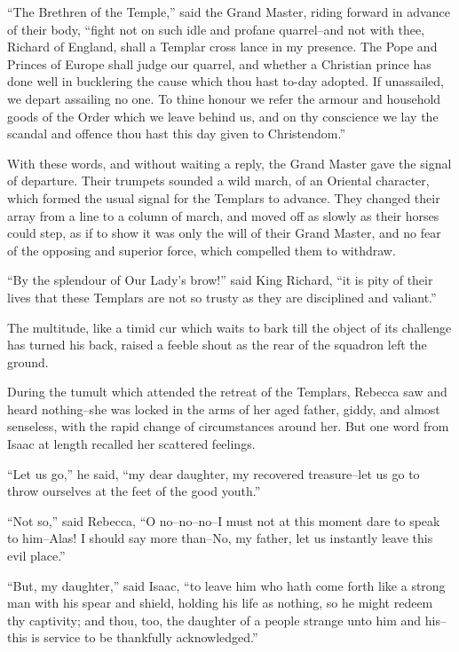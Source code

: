 ``The Brethren of the Temple,'' said the Grand Master, riding forward in
advance of their body, ``fight not on such idle and profane quarrel--and
not with thee, Richard of England, shall a Templar cross lance in my
presence. The Pope and Princes of Europe shall judge our quarrel, and
whether a Christian prince has done well in bucklering the cause which
thou hast to-day adopted. If unassailed, we depart assailing no one. To
thine honour we refer the armour and household goods of the Order which
we leave behind us, and on thy conscience we lay the scandal and offence
thou hast this day given to Christendom.''

With these words, and without waiting a reply, the Grand Master gave the
signal of departure. Their trumpets sounded a wild march, of an Oriental
character, which formed the usual signal for the Templars to advance.
They changed their array from a line to a column of march, and moved off
as slowly as their horses could step, as if to show it was only the will
of their Grand Master, and no fear of the opposing and superior force,
which compelled them to withdraw.

``By the splendour of Our Lady's brow!'' said King Richard, ``it is pity
of their lives that these Templars are not so trusty as they are
disciplined and valiant.''

The multitude, like a timid cur which waits to bark till the object of
its challenge has turned his back, raised a feeble shout as the rear of
the squadron left the ground.

During the tumult which attended the retreat of the Templars, Rebecca
saw and heard nothing--she was locked in the arms of her aged father,
giddy, and almost senseless, with the rapid change of circumstances
around her. But one word from Isaac at length recalled her scattered
feelings.

``Let us go,'' he said, ``my dear daughter, my recovered treasure--let
us go to throw ourselves at the feet of the good youth.''

``Not so,'' said Rebecca, ``O no--no--no--I must not at this moment dare
to speak to him--Alas! I should say more than--No, my father, let us
instantly leave this evil place.''

``But, my daughter,'' said Isaac, ``to leave him who hath come forth
like a strong man with his spear and shield, holding his life as
nothing, so he might redeem thy captivity; and thou, too, the daughter
of a people strange unto him and his--this is service to be thankfully
acknowledged.''

